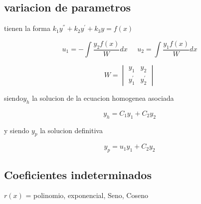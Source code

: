 \subsection{variacion de parametros}

tienen la forma $k_1y^{''} + k_2y^{'} + k_3y = f(x) $

$$u_1 = - \int \frac{y_2f(x)}{W} dx \;\; \;\;\; u_2 =  \int \frac{y_1f(x)}{W} dx $$

$$
W=
\begin{vmatrix}
y_1 & y_2 \\
	y_1^{'} & y_2^{'}
\end{vmatrix}
$$
\begin{center}
	siendo$y_h$ la solucion de la ecuacion homogenea asociada

	$$ y_h = C_1y_1 + C_2y_2 $$

	y siendo $y_p$ la solucion definitiva

	$$ y_p = u_1y_1 + C_2y_2 $$

\end{center}
\subsection{Coeficientes indeterminados}
\begin{center}
	$r(x)$ = polinomio, exponencial, Seno, Coseno 
\end{center}

